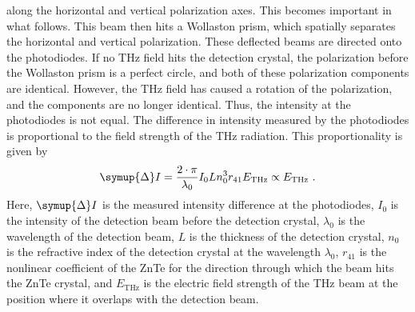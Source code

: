 along the horizontal and vertical polarization axes.
This becomes important in what follows.
This beam then hits a Wollaston prism, which spatially separates the horizontal and vertical
polarization.
These deflected beams are directed onto the photodiodes.
If no THz field hits the detection crystal, the polarization before the
Wollaston prism is a perfect circle, and both of these polarization components are identical.
However, the THz field has caused a rotation of the polarization, and the components are no
longer identical.
Thus, the intensity at the photodiodes is not equal.
The difference in intensity measured by the photodiodes is proportional to the field strength of
the THz radiation.
This proportionality is given by
\begin{equation}
    \symup{\Delta} I  =  \frac{2\cdot \pi}{\lambda_0}I_0 L n_0^3 r_{41}E_\text{THz}\propto E_\text{THz}\ .
\end{equation}
Here, $\symup{\Delta}I$ is the measured intensity difference at the photodiodes, $I_0$ is the
intensity of the detection beam before the detection crystal, $\lambda_0$ is the wavelength of
the detection beam, $L$ is the thickness of the detection crystal,
$n_0$ is the refractive index of the detection crystal at the wavelength $\lambda_0$, $r_{41}$ is
the nonlinear coefficient of the ZnTe for the direction through which the beam hits the ZnTe
crystal, and $E_\text{THz}$ is the electric field strength of the THz beam at the position where
it overlaps with the detection beam.
